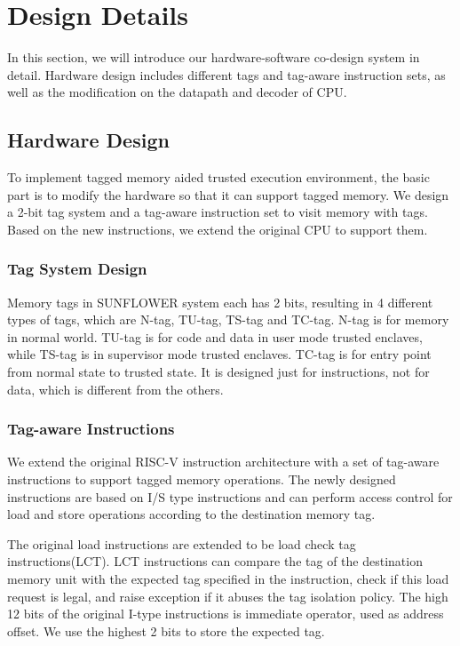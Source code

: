\documentclass[conference]{IEEEtran}
\begin{document}
\section{Design Details}
In this section, we will introduce our hardware-software co-design system in detail. Hardware design includes different tags and tag-aware instruction sets, as well as the modification on the datapath and decoder of CPU. %

\subsection{Hardware Design}
To implement tagged memory aided trusted execution environment, the basic part is to modify the hardware so that it can support tagged memory. We design a 2-bit tag system and a tag-aware instruction set to visit memory with tags. Based on the new instructions, we extend the original CPU to support them. 

\subsubsection{Tag System Design}
Memory tags in SUNFLOWER system each has 2 bits, resulting in 4 different types of tags, which are N-tag, TU-tag, TS-tag and TC-tag. N-tag is for memory in normal world. TU-tag is for code and data in user mode trusted enclaves, while TS-tag is in supervisor mode trusted enclaves. TC-tag is for entry point from normal state to trusted state. It is designed just for instructions, not for data, which is different from the others. 

\subsubsection{Tag-aware Instructions}
We extend the original RISC-V instruction architecture with a set of tag-aware instructions to support tagged memory operations. The newly designed instructions are based on I/S type instructions and can perform access control for load and store operations according to the destination memory tag. 

The original load instructions are extended to be load check tag instructions(LCT). LCT instructions can compare the tag of the destination memory unit with the expected tag specified in the instruction, check if this load request is legal, and raise exception if it abuses the tag isolation policy. The high 12 bits of the original I-type instructions is immediate operator, used as address offset. We use the highest 2 bits to store the expected tag.
\end{document}
